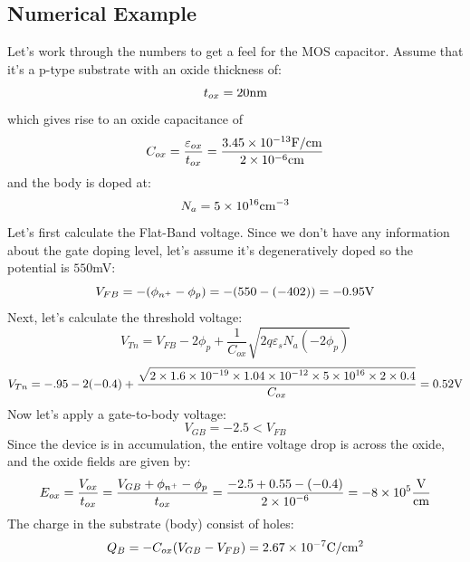 \subsection{Numerical Example}
Let's work through the numbers to get a feel for the  MOS capacitor.   Assume that it's a  p-type substrate with an oxide thickness of:
    \begin{equation}
        {t_{ox}} = 20{\rm{nm}}
    \end{equation}
which gives rise to an oxide capacitance of 
    \begin{equation}
        {C_{ox}} = \frac{{{\varepsilon _{ox}}}}{{{t_{ox}}}} = \frac{{3.45 \times {{10}^{ - 13}}{\rm{F/cm}}}}{{{\rm{2}} \times {\rm{1}}{{\rm{0}}^{{\rm{ - 6}}}}{\rm{cm}}}}
    \end{equation}
and the body is doped at:
    \begin{equation}
        {N_a} = 5 \times {10^{16}}{\rm{c}}{{\rm{m}}^{ - 3}}
    \end{equation}
Let's first calculate the Flat-Band voltage.  Since we don't have any information about the gate doping level, let's assume it's degeneratively doped so the potential is $550$mV:
    \begin{equation}
        {V_{FB}} =  - ({\phi _{{n^ + }}} - {\phi _p}) =  - (550 - ( - 402)) =  - 0.95{\rm{V}}
    \end{equation}
Next, let's calculate the threshold voltage:
    \begin{equation}
        {V_{Tn}} = {V_{FB}} - 2{\phi _p} + \frac{1}{{{C_{ox}}}}\sqrt {2q{\varepsilon _s}{N_a}( - 2{\phi _p})} 
    \end{equation}
    \begin{equation}
        {V_{Tn}} =  - .95 - 2( - 0.4) + \frac{{\sqrt {2 \times 1.6 \times {{10}^{ - 19}} \times 1.04 \times {{10}^{ - 12}} \times 5 \times {{10}^{16}} \times 2 \times 0.4} }}{{{C_{ox}}}} = 0.52{\rm{V}}
    \end{equation}
Now let's apply a gate-to-body voltage:
    \begin{equation}
        {V_{GB}} =  - 2.5 < {V_{FB}}
    \end{equation}
Since the device is in accumulation, the entire voltage drop is across the oxide, and the oxide fields are given by:
    \begin{equation}
        {E_{ox}} = \frac{{{V_{ox}}}}{{{t_{ox}}}} = \frac{{{V_{GB}} + {\phi _{{n^ + }}} - {\phi _p}}}{{{t_{ox}}}} = \frac{{ - 2.5 + 0.55 - ( - 0.4)}}{{2 \times {{10}^{ - 6}}}} =  - 8 \times {10^5}\frac{{\rm{V}}}{{{\rm{cm}}}}
    \end{equation}
The charge in the substrate (body) consist of holes:
    \begin{equation}
        {Q_B} =  - {C_{ox}}({V_{GB}} - {V_{FB}}) = 2.67 \times {10^{ - 7}}{\rm{C/c}}{{\rm{m}}^{\rm{2}}}
    \end{equation}

